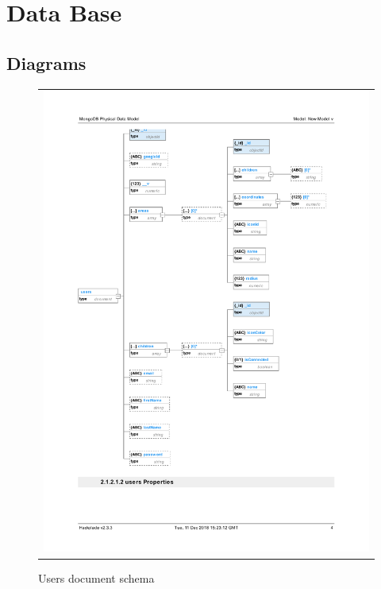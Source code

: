 \documentclass{sprawozdanie-agh}
\begin{document}
	\section{Data Base}

	\subsection{Diagrams}

		\begin{figure}[H] 
			\centering
			\begin{tabular}{c}
				\includegraphics[width=.95\textwidth]{usersDatabase1}
			\end{tabular} 
			\caption{Users document schema}
		\end{figure}
\end{document}
